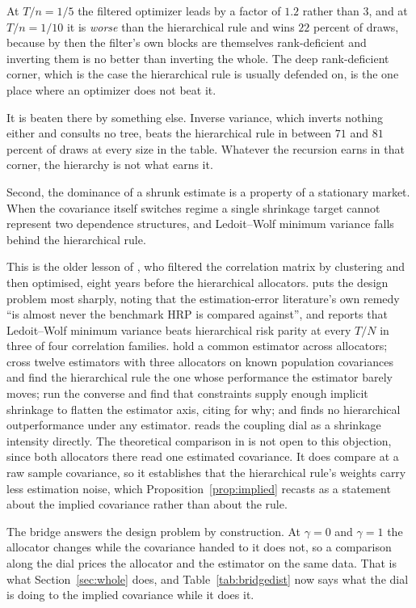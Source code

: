 \documentclass[11pt]{article}
\theoremstyle{remark}
\begin{document}
At $T/n = 1/5$ the filtered optimizer leads by a factor of $1.2$ rather than
$3$, and at $T/n = 1/10$ it is \emph{worse} than the hierarchical rule and
wins $22$ percent of draws, because by then the filter's own blocks are
themselves rank-deficient and inverting them is no better than inverting the
whole. The deep rank-deficient corner, which is the case the hierarchical
rule is usually defended on, is the one place where an optimizer does not
beat it.

It is beaten there by something else. Inverse variance, which inverts nothing
either and consults no tree, beats the hierarchical rule in between $71$ and
$81$ percent of draws at every size in the table. Whatever the recursion
earns in that corner, the hierarchy is not what earns it.

Second, the dominance of a shrunk estimate is a property of a stationary
market. When the covariance itself switches regime a single shrinkage target
cannot represent two dependence structures, and Ledoit--Wolf minimum variance
falls behind the hierarchical rule.

This is the older lesson of \cite{tola2008}, who filtered the correlation
matrix by clustering and then optimised, eight years before the hierarchical
allocators. \cite{soloviov2026} puts the design problem most sharply, noting
that the estimation-error literature's own remedy ``is almost never the
benchmark HRP is compared against'', and reports that
Ledoit--Wolf minimum variance beats hierarchical risk parity at every $T/N$
in three of four correlation families. \cite{jainjain2019} hold a common
estimator across allocators;
\cite{garciamedina2025} cross twelve estimators with three allocators on
known population covariances and find the hierarchical rule the one whose
performance the estimator barely moves; \cite{dom2025} run the converse and
find that constraints supply enough implicit shrinkage to flatten the
estimator axis, citing \cite{jagannathanma2003} for why; and
\cite{trucios2026} finds no hierarchical outperformance under any estimator.
\cite{wuebben2026} reads the coupling dial as a shrinkage intensity
directly. The theoretical comparison in \cite{antonov2025} is not open to
this objection, since both allocators there read one estimated covariance.
It does compare at a raw sample covariance, so it establishes that the
hierarchical rule's weights carry less estimation noise, which
Proposition~\ref{prop:implied} recasts as a statement about the implied
covariance rather than about the rule.

The bridge answers the design problem by construction. At $\gamma = 0$ and
$\gamma = 1$ the allocator changes while the covariance handed to it does
not, so a comparison along the dial prices the allocator and the estimator
on the same data. That is what Section~\ref{sec:whole} does, and
Table~\ref{tab:bridgedist} now says what the dial is doing to the implied
covariance while it does it.
\end{document}
